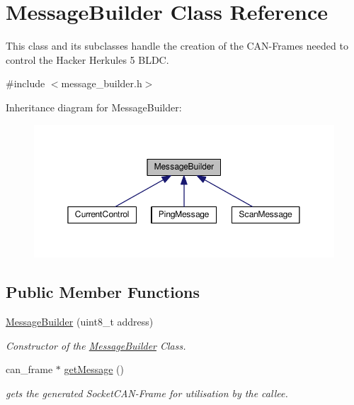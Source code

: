 \hypertarget{classMessageBuilder}{}\section{Message\+Builder Class Reference}
\label{classMessageBuilder}


This class and its subclasses handle the creation of the C\+A\+N-\/\+Frames needed to control the Hacker Herkules 5 B\+L\+DC.  




{\ttfamily \#include $<$message\+\_\+builder.\+h$>$}



Inheritance diagram for Message\+Builder\+:\nopagebreak
\begin{figure}[H]
\begin{center}
\leavevmode
\includegraphics[width=350pt]{classMessageBuilder__inherit__graph}
\end{center}
\end{figure}
\subsection*{Public Member Functions}
\begin{DoxyCompactItemize}
\item 
\hyperlink{classMessageBuilder_a4323114db973ba35f2834b42d6b58aa7}{Message\+Builder} (uint8\+\_\+t address)
\begin{DoxyCompactList}\small\item\em Constructor of the \hyperlink{classMessageBuilder}{Message\+Builder} Class. \end{DoxyCompactList}\item 
can\+\_\+frame $\ast$ \hyperlink{classMessageBuilder_a588441e4327872e90c3442e1cecd50c3}{get\+Message} ()
\begin{DoxyCompactList}\small\item\em gets the generated Socket\+C\+A\+N-\/\+Frame for utilisation by the callee. \end{DoxyCompactList}\end{DoxyCompactItemize}
